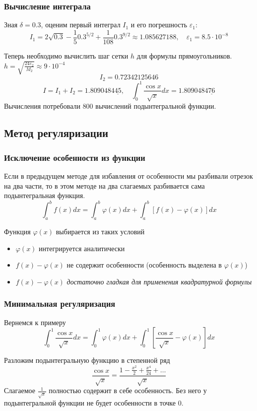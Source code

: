 \documentclass[aspectratio=169,unicode]{beamer}
\begin{document}
\begin{frame}
\frametitle{Вычисление интеграла}
	Зная $\delta = 0.3$, оценим первый интеграл $I_1$ и его погрешность $\varepsilon_1$:
	\[
	I_1 = 2\sqrt{0.3} - \frac{1}{5}0.3^{5/2} + \frac{1}{108}0.3^{9/2} \approx
1.085627188, \quad\varepsilon_1 = 8.5 \cdot 10^{-8}
	\]

	Теперь необходимо вычислить шаг сетки $h$ для формулы прямоугольников. $h =
\sqrt{\frac{24\varepsilon_2}{M_2}} \approx 9\cdot 10^{-4}$
	\[
	I_2 = 0.72342125646
	\]
	\[
	I = I_1 + I_2 = 1.8090484\underline{45}, \quad \int_0^1 \frac{\cos
x}{\sqrt{x}} dx = 1.8090484\underline{76}
	\]
	Вычисления потребовали $800$ вычислений подынтегральной функции.
\end{frame}

\subsection{Метод регуляризации}
\begin{frame}
\frametitle{Исключение особенности из функции}
	Если в предыдущем методе для избавления от особенности мы разбивали отрезок на два части, то
	в этом методе на два слагаемых разбивается сама подынтегральная функция.
	\pause
	\[
	\int_a^b f(x) dx = \int_a^b \varphi(x) dx + \int_a^b [f(x) - \varphi(x)] dx
	\]
	\pause

	Функция $\varphi(x)$ выбирается из таких условий
	\begin{itemize}
		\item $\varphi(x)$ интегрируется аналитически
		\item $f(x)-\varphi(x)$ не содержит особенности (особенность выделена в $\varphi(x)$)
		\item $f(x)-\varphi(x)$ \emph{достаточно гладкая для применения квадратурной формулы}
	\end{itemize}
\end{frame}

\begin{frame}
\frametitle{Минимальная регуляризация}
	Вернемся к примеру
	\[
	\int_0^1 \frac{\cos x}{\sqrt{x}} dx =
	\int_0^1 \varphi(x) dx +
	\int_0^1 \left[\frac{\cos x}{\sqrt{x}}-\varphi(x)\right] dx
	\]
	\pause

	Разложим подынтегральную функцию в степенной ряд
	\[
	\frac{\cos x}{\sqrt{x}} = \frac{1-\frac{x^2}{2} + \frac{x^4}{24} + \dots}{\sqrt{x}}
	\]
	\pause
	Слагаемое $\frac{1}{\sqrt{x}}$ полностью содержит в себе особенность. Без него
	у подынтегральной функции не будет особенности в точке $0$.
\end{frame}
\end{document}
